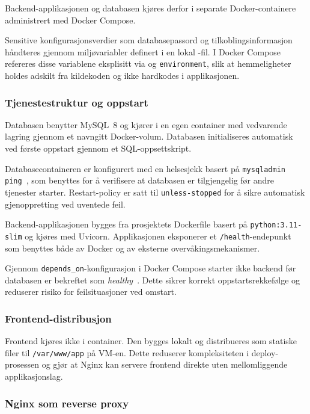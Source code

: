 Backend-applikasjonen og databasen kjøres derfor i separate
Docker-containere administrert med Docker Compose.

Sensitive konfigurasjonsverdier som databasepassord og tilkoblingsinformasjon håndteres gjennom miljøvariabler definert i en lokal \texttt{}-fil. I Docker Compose refereres disse variablene eksplisitt via \texttt{} og \texttt{environment}, slik at hemmeligheter holdes adskilt fra kildekoden og ikke hardkodes i applikasjonen.

\subsubsection{Tjenestestruktur og oppstart}

Databasen benytter MySQL~8 og kjører i en egen container med vedvarende
lagring gjennom et navngitt Docker-volum. Databasen initialiseres
automatisk ved første oppstart gjennom et SQL-oppsettskript.

Databasecontaineren er konfigurert med en helsesjekk basert på
\texttt{mysqladmin ping}~\cite{docker-healthcheck}, som benyttes for
å verifisere at databasen er tilgjengelig før andre tjenester starter.
Restart-policy er satt til \texttt{unless-stopped} for å sikre automatisk
gjenoppretting ved uventede feil.

Backend-applikasjonen bygges fra prosjektets Dockerfile basert på
\texttt{python:3.11-slim} og kjøres med Uvicorn. Applikasjonen
eksponerer et \texttt{/health}-endepunkt som benyttes både av Docker
og av eksterne overvåkingsmekanismer.

Gjennom \texttt{depends\_on}-konfigurasjon i Docker Compose starter
ikke backend før databasen er bekreftet som \textit{healthy}~\cite{docker-compose-depends}.
Dette sikrer korrekt oppstartsrekkefølge og reduserer risiko for
feilsituasjoner ved omstart.

\subsubsection{Frontend-distribusjon}

Frontend kjøres ikke i container. Den bygges lokalt og distribueres
som statiske filer til \texttt{/var/www/app} på VM-en.
Dette reduserer kompleksiteten i deploy-prosessen og gjør at
Nginx kan servere frontend direkte uten mellomliggende applikasjonslag.

\subsubsection{Nginx som reverse proxy}

